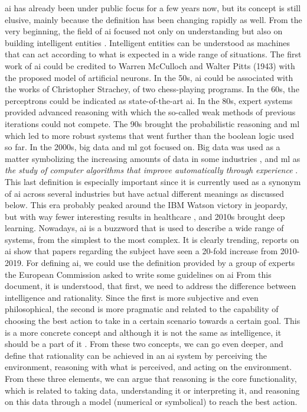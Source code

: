 \ac{ai} has already been under public focus for a few years now, but its concept is still elusive, mainly because the definition has been changing rapidly as well.
From the very beginning, the field of \ac{ai} focused not only on understanding but also on building intelligent entities \cite{DBLP:books/aw/RN2020}. Intelligent entities can be understood as machines that can act according to what is expected in a wide range of situations.
The first work of \ac{ai} could be credited to Warren McCulloch and Walter Pitts (1943) with the proposed model of artificial neurons. In the 50s, \ac{ai} could be associated with the works of Christopher Strachey, of two chess-playing programs.
In the 60s, the perceptrons could be indicated as state-of-the-art \ac{ai}. In the 80s, expert systems provided advanced reasoning with which the so-called weak methods of previous iterations could not compete.
The 90s brought the probabilistic reasoning and \ac{ml} which led to more robust systems that went further than the boolean logic used so far. In the 2000s, big data and \ac{ml} got focused on. Big data was used as a matter symbolizing the increasing amounts of data in some industries \cite{dashBigDataHealthcare2019}, and \ac{ml} as \textit{ the study of computer algorithms that improve automatically through experience} \cite{mitchell1997machine}. This last definition is especially important since it is currently used as a synonym of \ac{ai} across several industries but have actual different meanings as discussed below. This era probably peaked around the IBM Watson victory in jeopardy, but with way fewer interesting results in healthcare \cite{swetlitzIBMWatsonSupercomputer2018}, and 2010s brought deep learning. 
Nowadays, \ac{ai} is a buzzword that is used to describe a wide range of systems, from the simplest to the most complex. It is clearly trending, reports on \ac{ai} show that papers regarding the subject have seen a 20-fold increase from 2010-2019.
For defining \ac{ai}, we could use the definition provided by a group of experts the European Commission asked to write some guidelines on \ac{ai} \cite{DefinitionAIMain2019}
From this document, it is understood, that first, we need to address the difference between intelligence and rationality. Since the first is more subjective and even philosophical, the second is more pragmatic and related to the capability of choosing the best action to take in a certain scenario towards a certain goal. This is a more concrete concept and although it is not the same as intelligence, it should be a part of it \cite{DefinitionAIMain2019,DBLP:books/aw/RN2020}.
From these two concepts, we can go even deeper, and define that rationality can be achieved in an \ac{ai} system by perceiving the environment, reasoning with what is perceived, and acting on the environment. From these three elements, we can argue that reasoning is the core functionality, which is related to taking data, understanding it or interpreting it, and reasoning on this data through a model (numerical or symbolical) to reach the best action.

